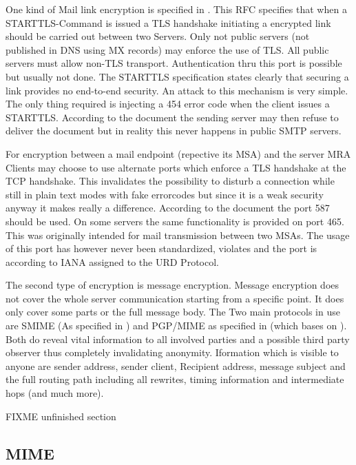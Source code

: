 One kind of Mail link encryption is specified in \cite{RFC3207}. This RFC specifies that when a STARTTLS-Command is issued a TLS handshake initiating a encrypted link should be carried out between two Servers. Only not public servers (not published in DNS using MX records) may enforce the use of TLS. All public servers must allow non-TLS transport. Authentication thru this port is possible but usually not done. The STARTTLS specification states clearly that securing a link provides no end-to-end security. An attack to this mechanism is very simple. The only thing required is injecting a 454 error code when the client issues a STARTTLS. According to the document the sending server may then refuse to deliver the document but in reality this never happens in public SMTP servers.\par

For encryption between a mail endpoint (repective its MSA)  and the server MRA Clients may choose to use alternate ports which enforce a TLS handshake at the TCP handshake. This invalidates the possibility to disturb a connection while still in plain text modes with fake errorcodes but since it is a weak security anyway it makes really a difference. According to the \cite{RFC3207} document the port 587 should be used. On some servers the same functionality is provided on port 465. This was originally intended for mail transmission between two MSAs. The usage of this port has however never been standardized, violates \cite{RFC6409} and the port is according to IANA assigned to the URD Protocol.\par

The second type of encryption is message encryption. Message encryption does not cover the whole server communication starting from a specific point. It does only cover some parts or the full message body. The Two main protocols in use are SMIME (As specified in \cite{RFC2311}) and PGP/MIME as specified in \cite {RFC2015}(which bases on \cite{RFC1847}). Both do reveal vital information to all involved parties and a possible third party observer thus completely invalidating anonymity. Iformation which is visible to anyone are sender address, sender client, Recipient address, message subject and the full routing path including all rewrites, timing information and intermediate hops (and much more).\par 

FIXME unfinished section

\subsection{MIME}
\cite{RFC2045}
\cite{RFC2046}
\cite{RFC2047}
\cite{RFC2048}
\cite{RFC2049}

